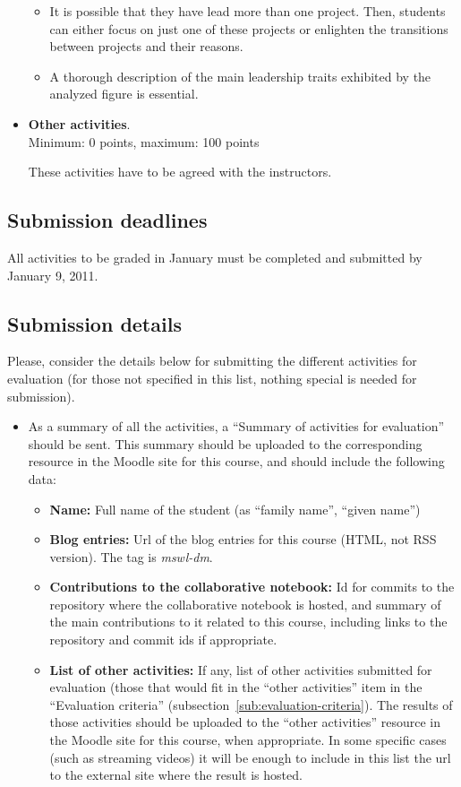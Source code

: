 \documentclass[a4paper]{article}
\begin{document}
\begin{itemize}
\begin{itemize}
   \item It is possible that they have lead more than one project. Then, students can either focus on just
   one of these projects or enlighten the transitions between projects and their reasons.
   \item A thorough description of the main leadership traits exhibited by the analyzed figure is essential.
  \end{itemize}


\item \textbf{Other activities}. \\
  Minimum: 0 points, maximum: 100 points

  These activities have to be agreed with the instructors.
\end{itemize}

\subsection{Submission deadlines}

All activities to be graded in January must be completed and submitted by January 9, 2011.

\subsection{Submission details}

Please, consider the details below for submitting the different activities for evaluation (for those not specified in this list, nothing special is needed for submission).

\begin{itemize}
\item As a summary of all the activities, a ``Summary of activities for evaluation'' should be sent. This summary should be uploaded to the corresponding resource in the Moodle site for this course, and should include the following data:
  \begin{itemize}
  \item \textbf{Name:} Full name of the student (as ``family name'', ``given name'')
  \item \textbf{Blog entries:} Url of the blog entries for this course (HTML, not RSS version). The tag is \textit{mswl-dm}.
  \item \textbf{Contributions to the collaborative notebook:} Id for commits to the repository where the collaborative notebook is hosted, and summary of the main contributions to it related to this course, including links to the repository and commit ids if appropriate.
  \item \textbf{List of other activities:} If any, list of other activities submitted for evaluation (those that would fit in the ``other activities'' item in the ``Evaluation criteria'' (subsection~\ref{sub:evaluation-criteria}). The results of those activities should be uploaded to the ``other activities'' resource in the Moodle site for this course, when appropriate. In some specific cases (such as streaming videos) it will be enough to include in this list the url to the external site where the result is hosted.
  \end{itemize}
\end{itemize}
\end{document}
